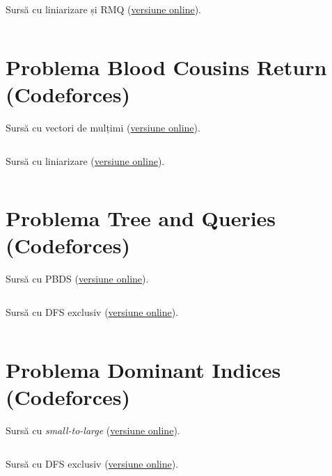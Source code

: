 \documentclass[../main.tex]{subfiles}
\begin{document}
\inputminted{cpp}{../src/trees/tokens-on-a-tree-2.cpp}

Sursă cu liniarizare și RMQ (\href{https://www.codechef.com/viewsolution/1224713815}{versiune online}).

\inputminted{cpp}{../src/trees/tokens-on-a-tree-3.cpp}

\section{Problema Blood Cousins Return (Codeforces)}
\label{code:blood-cousins-return}

Sursă cu vectori de mulțimi (\href{https://codeforces.com/contest/246/submission/294374128}{versiune online}).

\inputminted{cpp}{../src/trees/blood-cousins-return-1.cpp}

Sursă cu liniarizare (\href{https://codeforces.com/contest/246/submission/302020428}{versiune online}).

\inputminted{cpp}{../src/trees/blood-cousins-return-2.cpp}

\section{Problema Tree and Queries (Codeforces)}
\label{code:tree-and-queries}

Sursă cu PBDS (\href{https://codeforces.com/contest/375/submission/294200831}{versiune online}).

\inputminted{cpp}{../src/trees/tree-and-queries-pbds.cpp}

Sursă cu DFS exclusiv (\href{https://codeforces.com/contest/375/submission/294328719}{versiune online}).

\inputminted{cpp}{../src/trees/tree-and-queries-exclusive-small-to-large.cpp}

\section{Problema Dominant Indices (Codeforces)}
\label{code:dominant-indices}

Sursă cu \textit{small-to-large} (\href{https://codeforces.com/contest/1009/submission/357092692}{versiune online}).

\inputminted{cpp}{../src/trees/dominant-indices-small-to-large.cpp}

Sursă cu DFS exclusiv (\href{https://codeforces.com/contest/1009/submission/357105549}{versiune online}).

\inputminted{cpp}{../src/trees/dominant-indices-exclusive-dfs.cpp}
\end{document}
